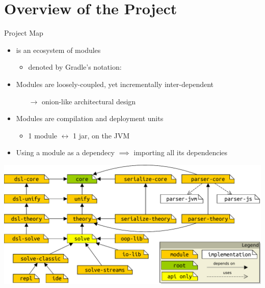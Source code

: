 \documentclass[handout]{beamer}
\begin{document}
\section{Overview of the Project}

\begin{frame}[allowframebreaks]{Project Map}
    \begin{itemize}
        \item \twopkt{} is an ecosystem of \alert{modules}
        \begin{itemize}
            \item denoted by Gradle's notation: 
        \end{itemize}

        \medskip

        \item Modules are \alert{loosely-coupled}, yet incrementally inter-dependent
        \begin{itemize}
            \item[$\rightarrow$] \alert{onion-like} architectural design
        \end{itemize}

        \medskip

        \item Modules are compilation and \alert{deployment units}
        \begin{itemize}
            \item 1 module $\leftrightarrow$ 1 jar, on the JVM
        \end{itemize}

        \medskip

        \item Using a module as a dependecy $\implies$ importing \alert{all} its dependencies
    \end{itemize}

    \framebreak

    \begin{center}
        \includegraphics[width=\linewidth]{img/project-map.pdf}
    \end{center}


\end{frame}
\end{document}
